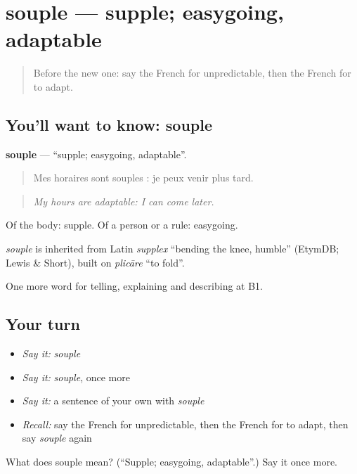 \section[souple]{souple — supple; easygoing, adaptable}

\label{lesson:FR-C370-souple}



\begin{quote}
Before the new one: say the French for unpredictable, then the French for to adapt.
\end{quote}

\subsection*{You'll want to know: souple}
\textbf{souple} — \textquotedblleft{}supple; easygoing, adaptable\textquotedblright{}.

\begin{quote}
Mes horaires sont souples : je peux venir plus tard.
\end{quote}

\begin{quote}
\emph{My hours are adaptable: I can come later.}
\end{quote}

Of the body: supple. Of a person or a rule: easygoing.

\begin{cousinweb}
\emph{souple} is inherited from Latin \emph{supplex} \textquotedblleft{}bending the knee, humble\textquotedblright{} (EtymDB; Lewis \& Short), built on \emph{plicāre} \textquotedblleft{}to fold\textquotedblright{}.
\end{cousinweb}

\begin{grammarlens}[title={What you've built}]
One more word for telling, explaining and describing at B1.
\end{grammarlens}

\subsection*{Your turn}
\begin{itemize}
\raggedright
  \item \emph{Say it:} \emph{souple}
  \item \emph{Say it:} \emph{souple}, once more
  \item \emph{Say it:} a sentence of your own with \emph{souple}
  \item \emph{Recall:} say the French for unpredictable, then the French for to adapt, then say \emph{souple} again
\end{itemize}

\begin{tcolorbox}[breakable,colback=teal!4,colframe=teal!35!black,title={Before you move on}]
What does souple mean? (\textquotedblleft{}Supple; easygoing, adaptable\textquotedblright{}.) Say it once more.
\end{tcolorbox}
